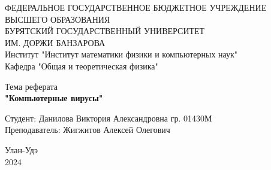 \begin{titlepage}
\begin{center}
    ФЕДЕРАЛЬНОЕ ГОСУДАРСТВЕННОЕ БЮДЖЕТНОЕ УЧРЕЖДЕНИЕ \\
    ВЫСШЕГО ОБРАЗОВАНИЯ \\
    БУРЯТСКИЙ ГОСУДАРСТВЕННЫЙ УНИВЕРСИТЕТ\\
    ИМ. ДОРЖИ БАНЗАРОВА \\
    Институт "Институт математики физики и компьютерных наук" \\
    Кафедра "Общая и теоретическая физика"
\end{center}

\vspace{28em}

\begin{center}
    Тема реферата \\ \textbf{"Компьютерные вирусы"}
\end{center}

\newbox{\lbox}
\newlength{\maxl}
\vspace{18em}
\setlength{\maxl}{\wd\lbox}
\hfill\parbox{5cm}{
\hspace*{5cm}\hspace*{-5cm}Студент:  Данилова Виктория Александровна гр. 01430М\hfill\\
\hspace*{5cm}\hspace*{-5cm}Преподаватель: Жигжитов Алексей Олегович\\
}

\vspace{\fill}
\begin{center}
    Улан-Удэ \\2024
\end{center}
\end{titlepage}